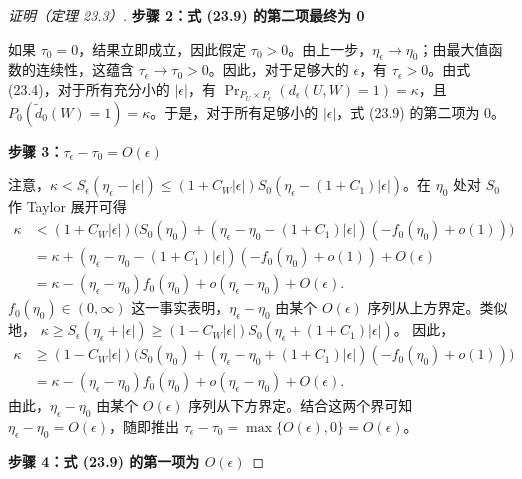 \begin{proof}[证明（定理 23.3）]
\medskip\noindent\textbf{步骤 2：式 (23.9) 的第二项最终为 0}

如果 $\tau_0=0$，结果立即成立，因此假定 $\tau_0>0$。由上一步，$\eta_\epsilon\to\eta_0$；由最大值函数的连续性，这蕴含 $\tau_\epsilon\to\tau_0>0$。因此，对于足够大的 $\epsilon$，有 $\tau_\epsilon>0$。由式 (23.4)，对于所有充分小的 $|\epsilon|$，有 $\Pr_{P_U\times P_\epsilon}(d_\epsilon(U,W)=1)=\kappa$，且 $P_0(\tilde d_0(W)=1)=\kappa$。于是，对于所有足够小的 $|\epsilon|$，式 (23.9) 的第二项为 0。

\medskip\noindent\textbf{步骤 3：$\tau_\epsilon-\tau_0=O(\epsilon)$}

注意，$\kappa<S_\epsilon(\eta_\epsilon-|\epsilon|)\leq(1+C_W|\epsilon|)S_0(\eta_\epsilon-(1+C_1)|\epsilon|)$。在 $\eta_0$ 处对 $S_0$ 作 Taylor 展开可得
\begin{equation}
\begin{aligned}
 \kappa&<(1+C_W|\epsilon|)\bigl(S_0(\eta_0)
 +(\eta_\epsilon-\eta_0-(1+C_1)|\epsilon|)(-f_0(\eta_0)+o(1))\bigr)\\
 &=\kappa+(\eta_\epsilon-\eta_0-(1+C_1)|\epsilon|)(-f_0(\eta_0)+o(1))+O(\epsilon)\\
 &=\kappa-(\eta_\epsilon-\eta_0)f_0(\eta_0)+o(\eta_\epsilon-\eta_0)+O(\epsilon).
\end{aligned}
\tag{23.11}
\end{equation}
$f_0(\eta_0)\in(0,\infty)$ 这一事实表明，$\eta_\epsilon-\eta_0$ 由某个 $O(\epsilon)$ 序列从上方界定。类似地，
$\kappa\geq S_\epsilon(\eta_\epsilon+|\epsilon|)\geq(1-C_W|\epsilon|)S_0(\eta_\epsilon+(1+C_1)|\epsilon|)$。
因此，
\[
\begin{aligned}
 \kappa&\geq(1-C_W|\epsilon|)\bigl(S_0(\eta_0)
 +(\eta_\epsilon-\eta_0+(1+C_1)|\epsilon|)(-f_0(\eta_0)+o(1))\bigr)\\
 &=\kappa-(\eta_\epsilon-\eta_0)f_0(\eta_0)+o(\eta_\epsilon-\eta_0)+O(\epsilon).
\end{aligned}
\]
由此，$\eta_\epsilon-\eta_0$ 由某个 $O(\epsilon)$ 序列从下方界定。结合这两个界可知 $\eta_\epsilon-\eta_0=O(\epsilon)$，随即推出
$\tau_\epsilon-\tau_0=\max\{O(\epsilon),0\}=O(\epsilon)$。

\medskip\noindent\textbf{步骤 4：式 (23.9) 的第一项为 $O(\epsilon)$}


\end{proof}
